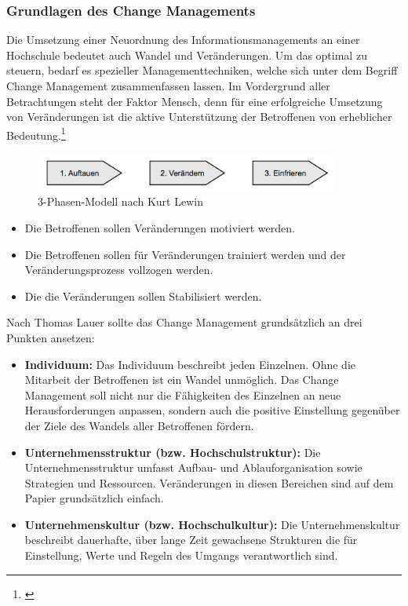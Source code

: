 
\subsubsection{Grundlagen des Change Managements}
Die Umsetzung einer Neuordnung des Informationsmanagements an einer Hochschule bedeutet auch Wandel und Veränderungen. Um das optimal zu steuern, bedarf es spezieller Managementtechniken, welche sich unter dem Begriff Change Management zusammenfassen lassen. Im Vordergrund aller Betrachtungen steht der Faktor Mensch, denn für eine erfolgreiche Umsetzung von Veränderungen ist die aktive Unterstützung der Betroffenen von erheblicher Bedeutung.\footnote{\cite{lauer_change_2014}}

\begin{figure}[h!]
	\centering
	\includegraphics[width=10cm]{kapitel/gruppe4_1/bilder/drei_phasen_modell}
	\caption{3-Phasen-Modell nach Kurt Lewin}
	\label{fig_drei_phasen_modell}
\end{figure}

\begin{itemize}
	\item Die Betroffenen sollen Veränderungen motiviert werden.
	\item Die Betroffenen sollen für Veränderungen trainiert werden und der Veränderungsprozess vollzogen werden.
	\item Die die Veränderungen sollen Stabilisiert werden.
\end{itemize}


Nach Thomas Lauer sollte das Change Management grundsätzlich an drei Punkten ansetzen:
\begin{itemize}
	\item \textbf{Individuum:} Das Individuum beschreibt jeden Einzelnen. Ohne die Mitarbeit der Betroffenen ist ein Wandel unmöglich. Das Change Management soll nicht nur die Fähigkeiten des Einzelnen an neue Herausforderungen anpassen, sondern auch die positive Einstellung gegenüber der Ziele des Wandels aller Betroffenen fördern.
	\item \textbf{Unternehmensstruktur (bzw. Hochschulstruktur):} Die Unternehmensstruktur umfasst Aufbau- und Ablauforganisation sowie Strategien und Ressourcen. Veränderungen in diesen Bereichen sind auf dem Papier grundsätzlich einfach.
	\item \textbf{Unternehmenskultur (bzw. Hochschulkultur):} Die Unternehmenskultur beschreibt dauerhafte, über lange Zeit gewachsene Strukturen die für Einstellung, Werte und Regeln des Umgangs verantwortlich sind. 
\end{itemize}

